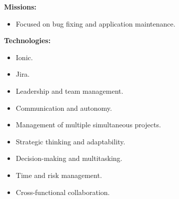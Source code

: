 \documentclass[10pt,a4paper,withhyper]{altacv}
\begin{document}
\begin{paracol}{2}
\divider


\textbf{Missions:}

\begin{itemize}
	\addtolength{\itemindent}{0.1cm}
	\item Focused on bug fixing and application maintenance.
\end{itemize}
	\textbf{Technologies:}	
\begin{itemize}
	\addtolength{\itemindent}{0.1cm}
	\item Ionic.
	\item Jira.
\end{itemize}





\switchcolumn


\begin{itemize}
	\item Leadership and team management.
	\item Communication and autonomy.
	\item Management of multiple simultaneous projects.
	\item Strategic thinking and adaptability.
	\item Decision-making and multitasking.
	\item Time and risk management.
	\item Cross-functional collaboration.
\end{itemize}


\end{paracol}
\end{document}
